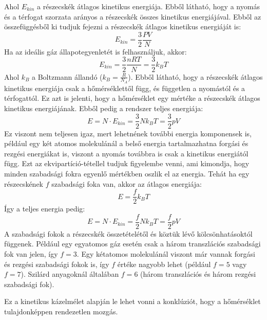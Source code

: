 \documentclass[a4paper,12pt]{article}
\begin{document}
Ahol $E_{kin}$ a részecskék átlagos kinetikus energiája. Ebből látható, hogy a nyomás és a térfogat szorzata arányos a részecskék összes kinetikus energiájával. Ebből az összefüggésből ki tudjuk fejezni a részecskék átlagos kinetikus energiáját is:
\begin{equation}
    E_{kin} = \frac{3}{2} \frac{P V}{N}
\end{equation}
Ha az ideális gáz állapotegyenletét is felhasználjuk, akkor:
\begin{equation}
    E_{kin} = \frac{3}{2} \frac{n R T}{N} = \frac{3}{2} k_B T
\end{equation}
Ahol $k_B$ a Boltzmann állandó ($k_B = \frac{R}{N_A}$). Ebből látható, hogy a részecskék átlagos kinetikus energiája csak a hőmérséklettől függ, és független a nyomástól és a térfogattól. Ez azt is jelenti, hogy a hőmérséklet egy mértéke a részecskék átlagos kinetikus energiájának.
Ebből pedig a rendszer teljes energiája:
\begin{equation}
    E = N \cdot E_{kin} = \frac{3}{2} N k_B T = \frac{3}{2} pV
\end{equation}
Ez viszont nem teljesen igaz, mert lehetnének további energia komponensek is, például egy két atomos molekulánál a belső energia tartalmazhatna forgási és rezgési energiákat is, viszont a nyomás továbbra is csak a kinetikus energiától függ.
Ezt az ekvipartíció-tétellel tudjuk figyelembe venni, ami kimondja, hogy minden szabadsági fokra egyenlő mértékben oszlik el az energia. Tehát ha egy részecskének $f$ szabadsági foka van, akkor az átlagos energiája:
\begin{equation}
    E = \frac{f}{2} k_B T
\end{equation}
Így a teljes energia pedig:
\begin{equation}
    E = N \cdot E_{kin} = \frac{f}{2} N k_B T = \frac{f}{2} pV
\end{equation}
A szabadsági fokok a részecskék összetételétől és köztük lévő kölcsönhatásoktól függenek. Például egy egyatomos gáz esetén csak a három transzlációs szabadsági fok van jelen, így $f = 3$. Egy kétatomos molekulánál viszont már vannak forgási és rezgési szabadsági fokok is, így $f$ értéke nagyobb lehet (például $f = 5$ vagy $f = 7$). 
Szilárd anyagoknál általában $f = 6$ (három transzlációs és három rezgési szabadsági fok).

Ez a kinetikus kázelmélet alapján le lehet vonni a konklúziót, hogy a hőmérséklet tulajdonképpen rendezetlen mozgás.
\end{document}
